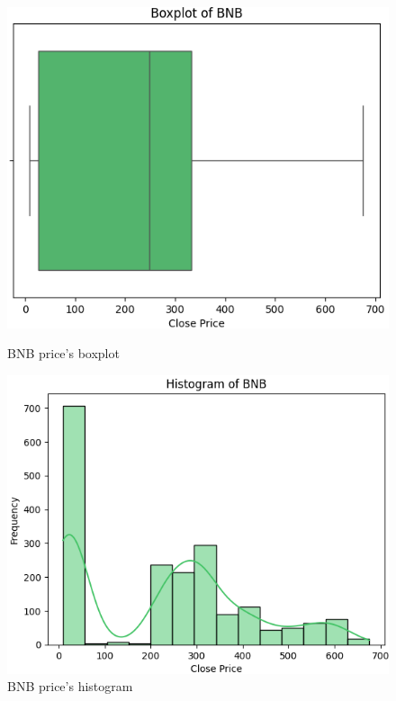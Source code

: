 \documentclass{ieeeojies}
\begin{document}
\begin{figure}[H]
    \centering
    \begin{minipage}{0.23\textwidth}
    \centering
    \includegraphics[width=1\textwidth]{image/bnb1.png}
    \caption{BNB price's boxplot}
    \label{fig:1}
    \end{minipage}
    \hfill
    \begin{minipage}{0.23\textwidth}
    \centering
    \includegraphics[width=1\textwidth]{image/bnb2.png}
    \caption{BNB price's histogram}
    \label{fig:2}
    \end{minipage}
\end{figure}
\end{document}
